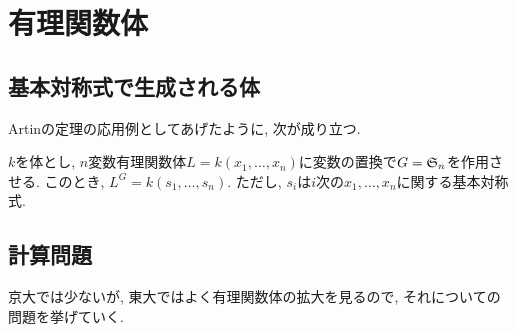 \section{有理関数体}
\subsection{基本対称式で生成される体}
Artinの定理の応用例としてあげたように, 次が成り立つ.
\begin{prop} $k$を体とし, $n$変数有理関数体$L=k(x_1,\dots, x_n)$に変数の置換で$G=\mathfrak{S}_n$を作用させる. このとき, $L^{G} = k(s_1,\dots, s_n)$. ただし, $s_i$は$i$次の$x_1,\dots, x_n$に関する基本対称式.
\end{prop}


\subsection{計算問題}
京大では少ないが, 東大ではよく有理関数体の拡大を見るので, それについての問題を挙げていく.

